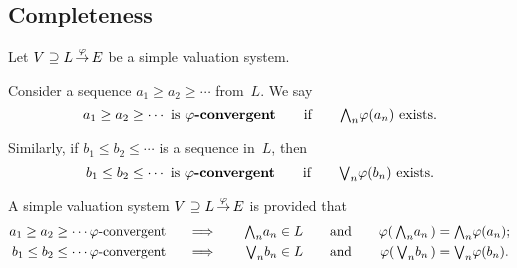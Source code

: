 \documentclass[main.tex]{subfiles}
\begin{document}
\subsection{Completeness}
%
%
\begin{dfn}
Let $V \supseteq L\,\smash{\stackrel{\varphi}{\rightarrow}}\,E$ be a simple valuation system.

Consider a sequence
$a_1 \geq a_2 \geq \dotsb$ from~$L$.
We say
\begin{equation*}
a_1 \geq a_2 \geq \dotsb \text{ is \textbf{$\varphi$-convergent}}
\qquad\text{if}\qquad \textstyle{\bigwedge}_n \varphi(a_n)\text{ exists.}
\end{equation*}

Similarly,
if
$b_1 \leq b_2 \leq \dotsb$ is
a sequence in~$L$, then 
\begin{equation*}
b_1 \leq b_2 \leq \dotsb \text{ is \textbf{$\varphi$-convergent}}
\qquad\text{if}\qquad \textstyle{\bigvee}_n \varphi(b_n)\text{ exists.}
\end{equation*}
\end{dfn}
%
%
\begin{dfn}
\label{D:system-complete}
A simple valuation system 
$V \supseteq L\,\smash{\stackrel{\varphi}{\rightarrow}}\,E$ is  provided that
\begin{alignat*}{5}
a_1 \geq a_2 \geq \dotsb \text{$\varphi$-convergent }
  \quad &\implies \quad 
  & \textstyle{\bigwedge}_n a_n &\in L\quad 
  &&\text{and}\quad
  &\varphi(\,\textstyle{\bigwedge}_n a_n\,) &= \textstyle{\bigwedge}_n \varphi(a_n); \\
b_1 \leq b_2 \leq \dotsb \text{$\varphi$-convergent }
  \quad &\implies \quad 
  & \textstyle{\bigvee}_n b_n &\in L\quad 
  &&\text{and}\quad
  &\varphi(\,\textstyle{\bigvee}_n b_n\,) &= \textstyle{\bigvee}_n \varphi(b_n).
\end{alignat*}
\end{dfn}

\end{document}
